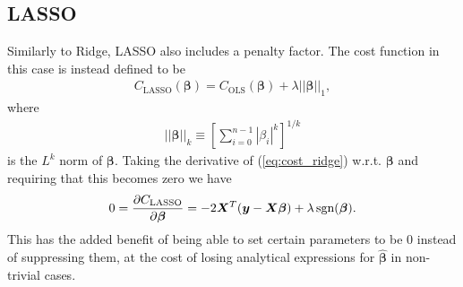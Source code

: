 \documentclass[%
reprint,
amsmath,amssymb,
aps,
pra,
]{revtex4-2}
\begin{document}
\subsection{LASSO}	\label{sec:THEORY_LASSO}
Similarly to Ridge, LASSO also includes a penalty factor. The cost function in this case is instead defined to be
\begin{align}
	C_\text{LASSO}(\bm\beta)=C_\text{OLS}(\bm\beta)+\lambda||\bm\beta||_1,
	\label{eq:cost_lasso}
\end{align}
where
\begin{align*}
	||\bm\beta||_k\equiv\left[\sum_{i=0}^{n-1}|\beta_i|^k\right]^{1/k}
\end{align*}
is the $L^k$ norm of $\bm\beta$. Taking the derivative of (\ref{eq:cost_ridge}) w.r.t. $\bm \beta$ and requiring that this becomes zero we have
\begin{align}
	0=\pdv{C_\text{LASSO}}{\bm\beta}=-2\bm X^T(\bm y-\bm X\bm\beta)+\lambda\,\text{sgn}(\bm\beta).
\end{align}
This has the added benefit of being able to set certain parameters to be $0$ instead of suppressing them, at the cost of losing analytical expressions for $\hat{\bm\beta}$ in non-trivial cases.
\end{document}
